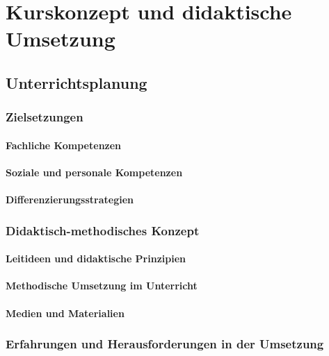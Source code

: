 \chapter{Kurskonzept und didaktische Umsetzung}
\label{sec:konzept}

\section{Unterrichtsplanung}
\subsection{Zielsetzungen}
\subsubsection{Fachliche Kompetenzen}
\subsubsection{Soziale und personale Kompetenzen}
\subsubsection{Differenzierungsstrategien}

\subsection{Didaktisch-methodisches Konzept}
\subsubsection{Leitideen und didaktische Prinzipien}
\subsubsection{Methodische Umsetzung im Unterricht}
\subsubsection{Medien und Materialien}

\subsection{Erfahrungen und Herausforderungen in der Umsetzung}
